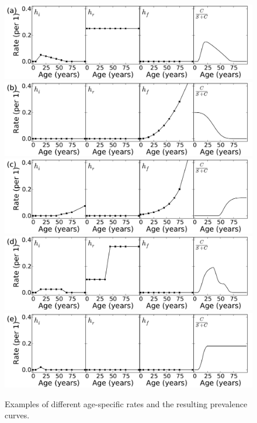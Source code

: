 \begin{figure}
\begin{center}
\includegraphics[width=\textwidth]{forward-sim-mental.pdf}
\includegraphics[width=\textwidth]{forward-sim-congenital.pdf}
\includegraphics[width=\textwidth]{forward-sim-old_age.pdf}
\includegraphics[width=\textwidth]{forward-sim-reproductive.pdf}
\includegraphics[width=\textwidth]{forward-sim-incidence_pulse.pdf}
\caption{Examples of different age-specific rates and the resulting prevalence curves.} 
\label{forward-sim-ex3}
\end{center}
\end{figure}
